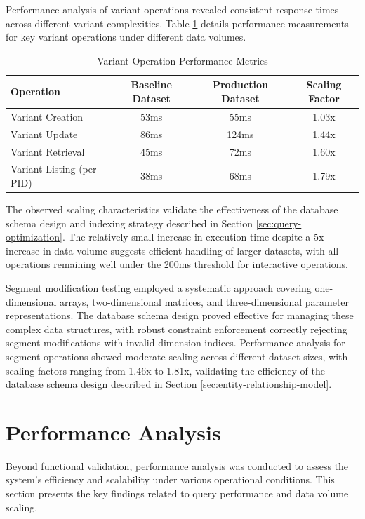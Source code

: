 Performance analysis of variant operations revealed consistent response times across different variant complexities. Table \ref{tab:variant-operation-performance} details performance measurements for key variant operations under different data volumes.

\begin{table}[h]
\centering
\caption{Variant Operation Performance Metrics}
\label{tab:variant-operation-performance}
\begin{tabular}{|l|c|c|c|}
\hline
\textbf{Operation} & \textbf{Baseline Dataset} & \textbf{Production Dataset} & \textbf{Scaling Factor} \\
\hline
Variant Creation & 53ms & 55ms & 1.03x \\
\hline
Variant Update & 86ms & 124ms & 1.44x \\
\hline
Variant Retrieval & 45ms & 72ms & 1.60x \\
\hline
Variant Listing (per PID) & 38ms & 68ms & 1.79x \\
\hline
\end{tabular}
\end{table}

The observed scaling characteristics validate the effectiveness of the database schema design and indexing strategy described in Section \ref{sec:query-optimization}. The relatively small increase in execution time despite a 5x increase in data volume suggests efficient handling of larger datasets, with all operations remaining well under the 200ms threshold for interactive operations.

Segment modification testing employed a systematic approach covering one-dimensional arrays, two-dimensional matrices, and three-dimensional parameter representations. The database schema design proved effective for managing these complex data structures, with robust constraint enforcement correctly rejecting segment modifications with invalid dimension indices. Performance analysis for segment operations showed moderate scaling across different dataset sizes, with scaling factors ranging from 1.46x to 1.81x, validating the efficiency of the database schema design described in Section \ref{sec:entity-relationship-model}.

\section{Performance Analysis}
\label{sec:performance-analysis}

Beyond functional validation, performance analysis was conducted to assess the system's efficiency and scalability under various operational conditions. This section presents the key findings related to query performance and data volume scaling.

